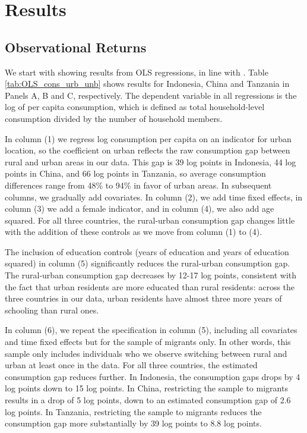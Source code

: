 \section{Results}\label{sec:results}

\subsection{Observational Returns}\label{sec:observational-returns}

We start with showing results from OLS regressions, in line with 
\cite{hamoryReevaluatingAgriculturalProductivity2021}. 
Table \ref{tab:OLS_cons_urb_unb} shows results for Indonesia, China and Tanzania in Panels A, B and C, respectively. 
The dependent variable in all regressions is the log of per capita consumption, which is defined as total household-level consumption divided by the number of household members. 

In column (1) we regress log consumption per capita on an indicator for urban location, so the coefficient on urban reflects the raw consumption gap between rural and urban areas in our data. 
This gap is 39 log points in Indonesia, 44 log points in China, and 66 log points in Tanzania, so average consumption differences range from 48\% to 94\% in favor of urban areas.
In subsequent columns, we gradually add covariates.  
In column (2), we add time fixed effects, in column (3) we add a female indicator, and in column (4), we also add age squared. 
For all three countries, the rural-urban consumption gap changes little with the addition of these controls as we move from column (1) to (4). 

The inclusion of education controls (years of education and years of education squared) in column (5) significantly reduces the rural-urban consumption gap.
The rural-urban consumption gap decreases by 12-17 log points, consistent with the fact that urban residents are more educated than rural residents: 
across the three countries in our data, urban residents have almost three more years of schooling than rural ones.

In column (6), we repeat the specification in column (5), including all covariates and time fixed effects but for the sample of migrants only.
In other words, this sample only includes individuals who we observe switching between rural and urban at least once in the data.
For all three countries, the estimated consumption gap reduces further. 
In Indonesia, the consumption gaps drops by 4 log points down to 15 log points.
In China, restricting the sample to migrants results in a drop of 5 log points, down to an estimated consumption gap of 2.6 log points.
In Tanzania, restricting the sample to migrants reduces the consumption gap more substantially by 39 log points to 8.8 log points.

